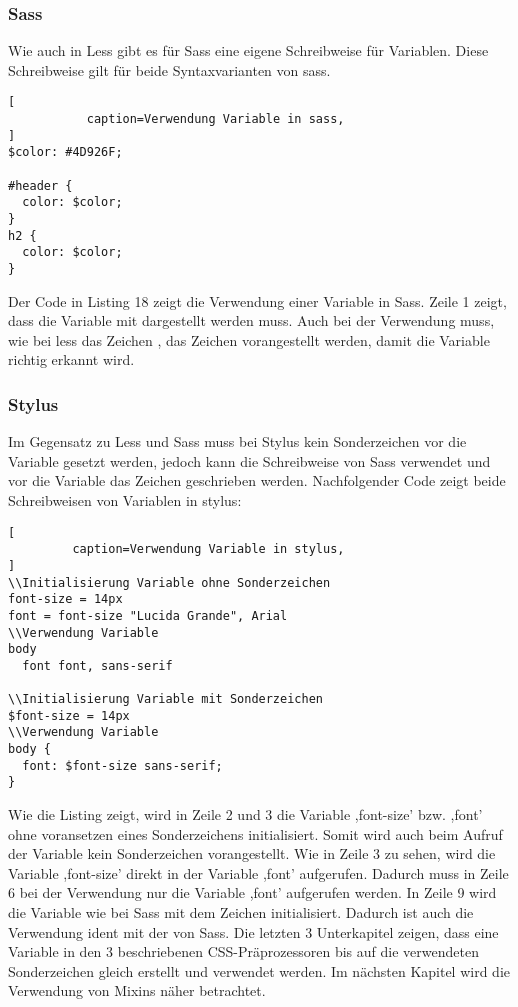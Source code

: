 \subsubsection{Sass}
Wie auch in Less gibt es für Sass eine eigene Schreibweise für Variablen. Diese Schreibweise gilt für beide Syntaxvarianten von sass.
\begin{lstlisting}[
           caption=Verwendung Variable in sass,
]
$color: #4D926F;

#header {
  color: $color;
}
h2 {
  color: $color;
}
\end{lstlisting}
Der Code in Listing 18 zeigt die Verwendung einer Variable in Sass. Zeile 1 zeigt, dass die Variable mit \grqq{\$}\glqq{} dargestellt werden muss. Auch bei der Verwendung muss, wie bei less das Zeichen \glqq{}, das Zeichen \grqq{\$}\glqq{} vorangestellt werden, damit die Variable richtig erkannt wird.
\subsubsection{Stylus}
Im Gegensatz zu Less und Sass muss bei Stylus kein Sonderzeichen vor die Variable gesetzt werden, jedoch kann die Schreibweise von Sass verwendet und vor die Variable das Zeichen \grqq{\$}\glqq{} geschrieben werden. Nachfolgender Code zeigt beide Schreibweisen von Variablen in stylus:
\begin{lstlisting}[
         caption=Verwendung Variable in stylus,
]
\\Initialisierung Variable ohne Sonderzeichen
font-size = 14px
font = font-size "Lucida Grande", Arial
\\Verwendung Variable
body
  font font, sans-serif

\\Initialisierung Variable mit Sonderzeichen
$font-size = 14px
\\Verwendung Variable
body {
  font: $font-size sans-serif;
}
\end{lstlisting}
Wie die Listing zeigt, wird in Zeile 2 und 3 die Variable ,font-size' bzw. ,font' ohne voransetzen eines Sonderzeichens initialisiert. Somit wird auch beim Aufruf der Variable kein Sonderzeichen vorangestellt. Wie in Zeile 3 zu sehen, wird die Variable ,font-size' direkt in der Variable ,font' aufgerufen. Dadurch muss in Zeile 6 bei der Verwendung nur die Variable ,font' aufgerufen werden.\newline
In Zeile 9 wird die Variable wie bei Sass mit dem Zeichen \grqq{\$}\glqq{} initialisiert. Dadurch ist auch die Verwendung ident mit der von Sass.\newline\newline
Die letzten 3 Unterkapitel zeigen, dass eine Variable in den 3 beschriebenen CSS-Präprozessoren bis auf die verwendeten Sonderzeichen gleich erstellt und verwendet werden.\newline
Im nächsten Kapitel wird die Verwendung von Mixins näher betrachtet.
